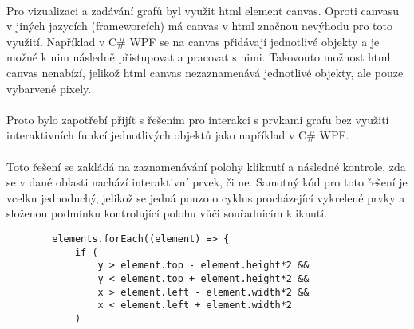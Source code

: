 \documentclass[12pt]{article}
\begin{document}
\paragraph{}
Pro vizualizaci a zadávání grafů byl využit html element canvas. Oproti 
canvasu v jiných jazycích (frameworcích) má canvas v html značnou nevýhodu
pro toto využití. Například v C\# WPF se na canvas přidávají jednotlivé objekty
a je možné k nim následně přistupovat a pracovat s nimi. Takovouto možnost html 
canvas nenabízí, jelikož html canvas nezaznamenává jednotlivé objekty, ale pouze
vybarvené pixely. \par
\paragraph{}
Proto bylo zapotřebí přijít s řešením pro interakci s prvkami grafu bez využití
interaktivních funkcí jednotlivých objektů jako například v C\# WPF. \par
\paragraph{}
Toto řešení se zakládá na zaznamenávání polohy kliknutí a následné kontrole, zda
se v dané oblasti nachází interaktivní prvek, či ne. Samotný kód pro toto řešení
je vcelku jednoduchý, jelikož se jedná pouzo o cyklus procházející vykrelené prvky
a složenou podmínku kontrolující polohu vůči souřadnicím kliknutí. \par
    \begin{lstlisting}
        elements.forEach((element) => {
            if (
                y > element.top - element.height*2 &&
                y < element.top + element.height*2 &&
                x > element.left - element.width*2 &&
                x < element.left + element.width*2
            )
    \end{lstlisting}
\end{document}
